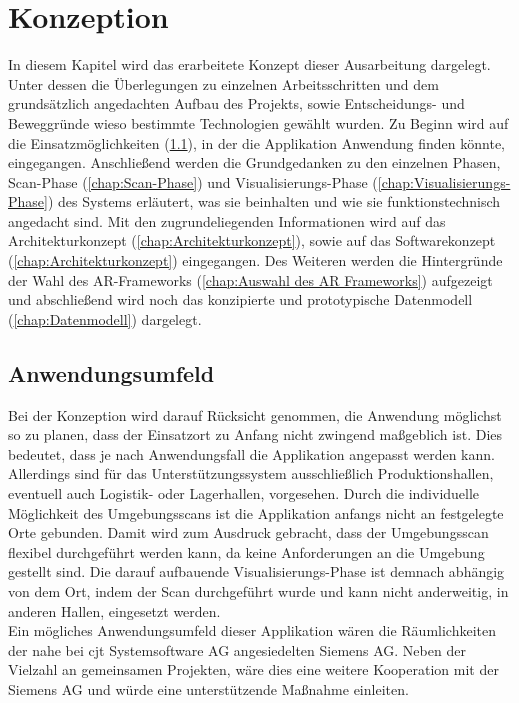 
\chapter{Konzeption}
\label{chap:Konzeption}
In diesem Kapitel wird das erarbeitete Konzept dieser Ausarbeitung dargelegt. Unter dessen die Überlegungen zu einzelnen 
Arbeitsschritten und dem grundsätzlich angedachten Aufbau des Projekts, sowie Entscheidungs- und Beweggründe wieso bestimmte 
Technologien gewählt wurden. Zu Beginn wird auf die Einsatzmöglichkeiten (\ref{chap:Arbeitsumgebung}), in der die Applikation Anwendung 
finden könnte, eingegangen. Anschließend werden die Grundgedanken zu den einzelnen Phasen, Scan-Phase (\ref{chap:Scan-Phase}) und 
Visualisierungs-Phase (\ref{chap:Visualisierungs-Phase}) des Systems erläutert, was sie beinhalten und wie sie funktionstechnisch 
angedacht sind. Mit den zugrundeliegenden Informationen wird auf das Architekturkonzept (\ref{chap:Architekturkonzept}), sowie auf das 
Softwarekonzept (\ref{chap:Architekturkonzept}) eingegangen. Des Weiteren werden die Hintergründe der Wahl des AR-Frameworks 
(\ref{chap:Auswahl des AR Frameworks}) aufgezeigt und abschließend wird noch das konzipierte und prototypische Datenmodell 
(\ref{chap:Datenmodell}) dargelegt.

\section{Anwendungsumfeld}
\label{chap:Arbeitsumgebung}
Bei der Konzeption wird darauf Rücksicht genommen, die Anwendung möglichst so zu planen, dass der Einsatzort zu Anfang nicht zwingend 
maßgeblich ist. Dies bedeutet, dass je nach Anwendungsfall die Applikation angepasst werden kann. Allerdings sind für das 
Unterstützungssystem ausschließlich Produktionshallen, eventuell auch Logistik- oder Lagerhallen, vorgesehen. Durch die individuelle 
Möglichkeit des Umgebungsscans ist die Applikation anfangs nicht an festgelegte Orte gebunden. Damit wird zum Ausdruck gebracht, dass der 
Umgebungsscan flexibel durchgeführt werden kann, da keine Anforderungen an die Umgebung gestellt sind. Die darauf aufbauende 
Visualisierungs-Phase ist demnach abhängig von dem Ort, indem der Scan durchgeführt wurde und kann nicht anderweitig, in anderen Hallen, 
eingesetzt werden. 
\\ 
\linebreak
Ein mögliches Anwendungsumfeld dieser Applikation wären die Räumlichkeiten der nahe bei cjt Systemsoftware AG angesiedelten Siemens AG. Neben 
der Vielzahl an gemeinsamen Projekten, wäre dies eine weitere Kooperation mit der Siemens AG und würde eine unterstützende Maßnahme einleiten. 
\pagebreak
